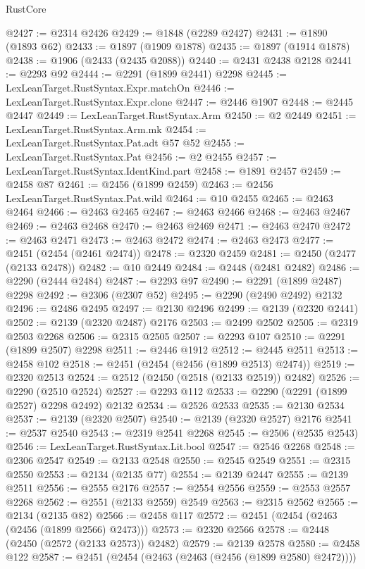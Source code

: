 \begin{lexlean}{RustCore}
\begin{coremodule}
@2427 := @2314 @2426
@2429 := @1848 (@2289 @2427)
@2431 := @1890 (@1893 @62)
@2433 := @1897 (@1909 @1878)
@2435 := @1897 (@1914 @1878)
@2438 := @1906 (@2433 (@2435 @2088))
@2440 := @2431 @2438 @2128
@2441 := @2293 @92
@2444 := @2291 (@1899 @2441) @2298
@2445 := LexLeanTarget.RustSyntax.Expr.matchOn
@2446 := LexLeanTarget.RustSyntax.Expr.clone
@2447 := @2446 @1907
@2448 := @2445 @2447
@2449 := LexLeanTarget.RustSyntax.Arm
@2450 := @2 @2449
@2451 := LexLeanTarget.RustSyntax.Arm.mk
@2454 := LexLeanTarget.RustSyntax.Pat.adt @57 @52
@2455 := LexLeanTarget.RustSyntax.Pat
@2456 := @2 @2455
@2457 := LexLeanTarget.RustSyntax.IdentKind.part
@2458 := @1891 @2457
@2459 := @2458 @87
@2461 := @2456 (@1899 @2459)
@2463 := @2456 LexLeanTarget.RustSyntax.Pat.wild
@2464 := @10 @2455
@2465 := @2463 @2464
@2466 := @2463 @2465
@2467 := @2463 @2466
@2468 := @2463 @2467
@2469 := @2463 @2468
@2470 := @2463 @2469
@2471 := @2463 @2470
@2472 := @2463 @2471
@2473 := @2463 @2472
@2474 := @2463 @2473
@2477 := @2451 (@2454 (@2461 @2474))
@2478 := @2320 @2459
@2481 := @2450 (@2477 (@2133 @2478))
@2482 := @10 @2449
@2484 := @2448 (@2481 @2482)
@2486 := @2290 (@2444 @2484)
@2487 := @2293 @97
@2490 := @2291 (@1899 @2487) @2298
@2492 := @2306 (@2307 @52)
@2495 := @2290 (@2490 @2492) @2132
@2496 := @2486 @2495
@2497 := @2130 @2496
@2499 := @2139 (@2320 @2441)
@2502 := @2139 (@2320 @2487) @2176
@2503 := @2499 @2502
@2505 := @2319 @2503 @2268
@2506 := @2315 @2505
@2507 := @2293 @107
@2510 := @2291 (@1899 @2507) @2298
@2511 := @2446 @1912
@2512 := @2445 @2511
@2513 := @2458 @102
@2518 := @2451 (@2454 (@2456 (@1899 @2513) @2474))
@2519 := @2320 @2513
@2524 := @2512 (@2450 (@2518 (@2133 @2519)) @2482)
@2526 := @2290 (@2510 @2524)
@2527 := @2293 @112
@2533 := @2290 (@2291 (@1899 @2527) @2298 @2492) @2132
@2534 := @2526 @2533
@2535 := @2130 @2534
@2537 := @2139 (@2320 @2507)
@2540 := @2139 (@2320 @2527) @2176
@2541 := @2537 @2540
@2543 := @2319 @2541 @2268
@2545 := @2506 (@2535 @2543)
@2546 := LexLeanTarget.RustSyntax.Lit.bool
@2547 := @2546 @2268
@2548 := @2306 @2547
@2549 := @2133 @2548
@2550 := @2545 @2549
@2551 := @2315 @2550
@2553 := @2134 (@2135 @77)
@2554 := @2139 @2447
@2555 := @2139 @2511
@2556 := @2555 @2176
@2557 := @2554 @2556
@2559 := @2553 @2557 @2268
@2562 := @2551 (@2133 @2559) @2549
@2563 := @2315 @2562
@2565 := @2134 (@2135 @82)
@2566 := @2458 @117
@2572 := @2451 (@2454 (@2463 (@2456 (@1899 @2566) @2473)))
@2573 := @2320 @2566
@2578 := @2448 (@2450 (@2572 (@2133 @2573)) @2482)
@2579 := @2139 @2578
@2580 := @2458 @122
@2587 := @2451 (@2454 (@2463 (@2463 (@2456 (@1899 @2580) @2472))))

\end{coremodule}
\end{lexlean}
